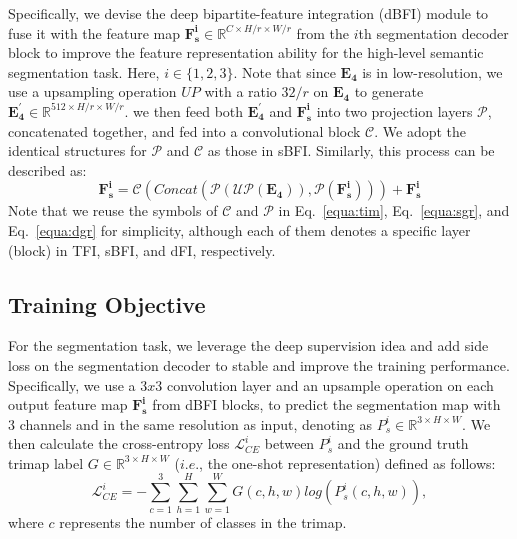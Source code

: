 \documentclass[sigconf]{acmart}
\begin{document}
Specifically, we devise the deep bipartite-feature integration (dBFI) module to fuse it with the feature map $\mathbf{F_s^i}\in\mathbb{R}^{C\times H/r \times W/r}$ from the $i$th segmentation decoder block to improve the feature representation ability for the high-level semantic segmentation task. Here, $i\in \{1,2,3\}$. Note that since $\mathbf{E_4}$ is in low-resolution, we use a upsampling operation $UP$ with a ratio $32/r$ on $\mathbf{E_4}$ to generate $\mathbf{E_4^{'}}\in \mathbb{R}^{512\times H/r \times W/r}$. we then feed both $\mathbf{E_4^{'}}$ and $\mathbf{F_s^i}$ into two projection layers $\mathcal{P}$, concatenated together, and fed into a convolutional block $\mathcal{C}$. We adopt the identical structures for $\mathcal{P}$ and $\mathcal{C}$ as those in sBFI. Similarly, this process can be described as: 
\begin{equation}
\mathbf{F_s^i} = \mathcal{C}(Concat(\mathcal{P}(\mathcal{UP}(\mathbf{E_4})),\mathcal{P}(\mathbf{F^i_s})))+\mathbf{F_s^i}
\label{equa:dgr}
\end{equation}
Note that we reuse the symbols of $\mathcal{C}$ and $\mathcal{P}$ in Eq.~\ref{equa:tim}, Eq.~\ref{equa:sgr}, and Eq.~\ref{equa:dgr} for simplicity, although each of them denotes a specific layer (block) in TFI, sBFI, and dFI, respectively.

\subsection{Training Objective}
For the segmentation task, we leverage the deep supervision idea and add side loss on the segmentation decoder to stable and improve the training performance. Specifically, we use a $3x3$ convolution layer and an upsample operation on each output feature map $\mathbf{F_s^i}$ from dBFI blocks, to predict the segmentation map with 3 channels and in the same resolution as input, denoting as ${P_s^{i}}\in \mathbb{R}^{3\times H \times W}$. 
We then calculate the cross-entropy loss $\mathcal{L}_{CE}^i$ between ${P_s^{i}}$ and the ground truth trimap label $G \in \mathbb{R}^{3\times H \times W}$ ($i.e.$, the one-shot representation) defined as follows:
\begin{equation}
\mathcal{L}_{CE}^i = -\sum_{c=1}^{3}\sum_{h=1}^{H}\sum_{w=1}^{W}{G(c,h,w)}log\left({P_s^{i}(c,h,w)}\right),
\label{equa:ce_loss}
\end{equation}
where $c$ represents the number of classes in the trimap.
\end{document}
